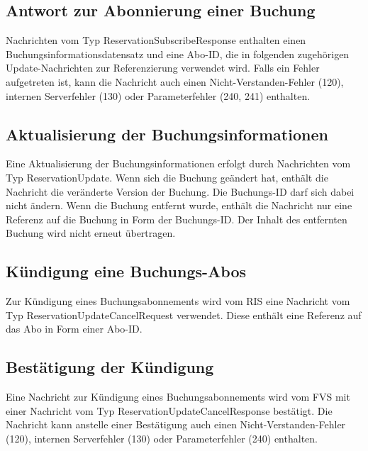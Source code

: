 

\subsection{Antwort zur Abonnierung einer Buchung}
Nachrichten vom Typ ReservationSubscribeResponse enthalten einen Buchungsinformationsdatensatz und eine Abo-ID, die in folgenden zugehörigen Update-Nachrichten zur Referenzierung verwendet wird. Falls ein Fehler aufgetreten ist, kann die Nachricht auch einen Nicht-Verstanden-Fehler (120), internen Serverfehler (130) oder Parameterfehler (240, 241) enthalten.



\subsection{Aktualisierung der Buchungsinformationen}
Eine Aktualisierung der Buchungsinformationen erfolgt durch Nachrichten vom Typ ReservationUpdate. Wenn sich die Buchung geändert hat, enthält die Nachricht die veränderte Version der Buchung. Die Buchungs-ID darf sich dabei nicht ändern. Wenn die Buchung entfernt wurde, enthält die Nachricht nur eine Referenz auf die Buchung in Form der Buchungs-ID. Der Inhalt des entfernten Buchung wird nicht erneut übertragen.



\subsection{Kündigung eine Buchungs-Abos}
Zur Kündigung eines Buchungsabonnements wird vom RIS eine Nachricht vom Typ ReservationUpdateCancelRequest verwendet. Diese enthält eine Referenz auf das Abo in Form einer Abo-ID.



\subsection{Bestätigung der Kündigung}
Eine Nachricht zur Kündigung eines Buchungsabonnements wird vom FVS mit einer Nachricht vom Typ ReservationUpdateCancelResponse bestätigt. Die Nachricht kann anstelle einer Bestätigung auch einen Nicht-Verstanden-Fehler (120), internen Serverfehler (130) oder Parameterfehler (240) enthalten.

